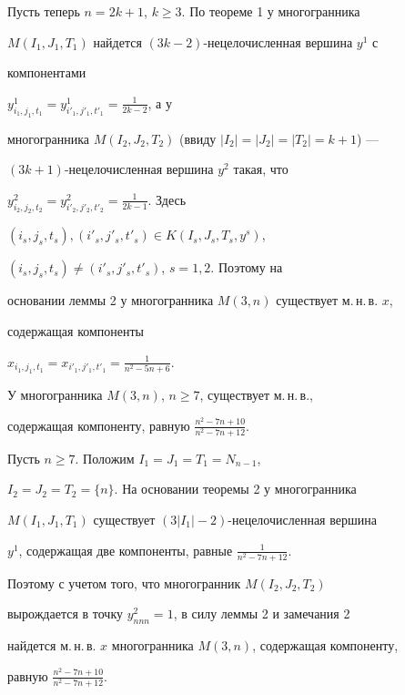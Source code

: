 \begin{pf}
Пусть теперь $n=2k+1$, $k\geq 3$. По теореме 1 у многогранника


$M(I_1,J_1,T_1)$ найдется $(3k-2)$-нецелочисленная вершина $y^1$ с


компонентами


$y^1_{i_1,j_1,t_1}=y^1_{i'_1,j'_1,t'_1}=\frac{1}{2k-2}$, а у


многогранника $M(I_2,J_2,T_2)$ (ввиду $|I_2|=|J_2|=|T_2|=k+1$) ---


$(3k+1)$-нецелочисленная вершина $y^2$ такая, что


$y^2_{i_2,j_2,t_2}=y^2_{i'_2,j'_2,t'_2}=\frac{1}{2k-1}$. Здесь


$(i_s,j_s,t_s),(i'_s,j'_s,t'_s)\in K(I_s,J_s,T_s,y^s)$,


$(i_s,j_s,t_s)\neq (i'_s,j'_s,t'_s)$, $s=1,2$. Поэтому на


основании леммы 2 у многогранника $M(3,n)$ существует м.\,н.\,в. $x$,


содержащая компоненты


$x_{i_1,j_1,t_1}=x_{i'_1,j'_1,t'_1}=\frac{1}{n^2 -5n+6}$.


\end{pf}





\begin{thm}


У многогранника $M(3,n)$, $n\geq 7$, существует м.\,н.\,в.,


содержащая компоненту, равную $\frac{n^2 -7n+10}{n^2 -7n+12}$.


\end{thm}





\begin{pf}


Пусть $n\geq 7$. Положим $I_1=J_1=T_1=N_{n-1}$,


$I_2=J_2=T_2=\{n\}$. На основании теоремы 2 у многогранника


$M(I_1,J_1,T_1)$ существует $(3|I_1|-2)$-нецелочисленная вершина


$y^1$, содержащая две компоненты, равные $\frac{1}{n^2 -7n+12}$.


Поэтому с учетом того, что многогранник $M(I_2,J_2,T_2)$


вырождается в точку $y^2_{nnn}=1$, в силу леммы 2 и замечания 2


найдется м.\,н.\,в. $x$ многогранника $M(3,n)$, содержащая компоненту,


равную $\frac{n^2 -7n+10}{n^2 -7n+12}$.


\end{pf}





